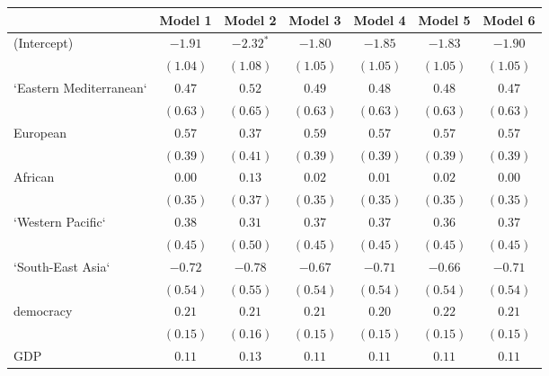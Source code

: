 
\begin{table}[!h]
\begin{center}
\begin{tabular}{l c c c c c c }
\toprule
 & Model 1 & Model 2 & Model 3 & Model 4 & Model 5 & Model 6 \\
\midrule
(Intercept)             & $-1.91$      & $-2.32^{*}$  & $-1.80$      & $-1.85$      & $-1.83$      & $-1.90$      \\
                        & $(1.04)$     & $(1.08)$     & $(1.05)$     & $(1.05)$     & $(1.05)$     & $(1.05)$     \\
`Eastern Mediterranean` & $0.47$       & $0.52$       & $0.49$       & $0.48$       & $0.48$       & $0.47$       \\
                        & $(0.63)$     & $(0.65)$     & $(0.63)$     & $(0.63)$     & $(0.63)$     & $(0.63)$     \\
European                & $0.57$       & $0.37$       & $0.59$       & $0.57$       & $0.57$       & $0.57$       \\
                        & $(0.39)$     & $(0.41)$     & $(0.39)$     & $(0.39)$     & $(0.39)$     & $(0.39)$     \\
African                 & $0.00$       & $0.13$       & $0.02$       & $0.01$       & $0.02$       & $0.00$       \\
                        & $(0.35)$     & $(0.37)$     & $(0.35)$     & $(0.35)$     & $(0.35)$     & $(0.35)$     \\
`Western Pacific`       & $0.38$       & $0.31$       & $0.37$       & $0.37$       & $0.36$       & $0.37$       \\
                        & $(0.45)$     & $(0.50)$     & $(0.45)$     & $(0.45)$     & $(0.45)$     & $(0.45)$     \\
`South-East Asia`       & $-0.72$      & $-0.78$      & $-0.67$      & $-0.71$      & $-0.66$      & $-0.71$      \\
                        & $(0.54)$     & $(0.55)$     & $(0.54)$     & $(0.54)$     & $(0.54)$     & $(0.54)$     \\
democracy               & $0.21$       & $0.21$       & $0.21$       & $0.20$       & $0.22$       & $0.21$       \\
                        & $(0.15)$     & $(0.16)$     & $(0.15)$     & $(0.15)$     & $(0.15)$     & $(0.15)$     \\
GDP                     & $0.11$       & $0.13$       & $0.11$       & $0.11$       & $0.11$       & $0.11$       \\

\end{tabular}
\end{center}
\end{table}
